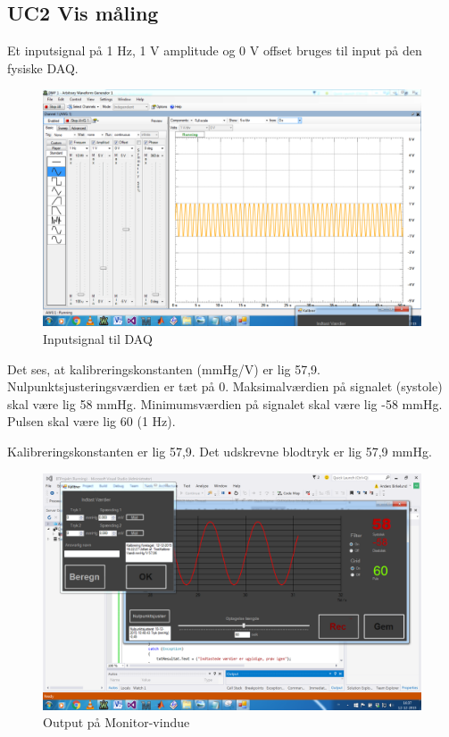 \subsection{UC2 Vis måling}
Et inputsignal på 1 Hz, 1 V amplitude og 0 V offset bruges til input på den fysiske DAQ. 
\begin{figure}[H]
	\centering
	\includegraphics[width=1\textwidth]{Figurer/Test_Vis_1}
	\caption{Inputsignal til DAQ}
\end{figure}

Det ses, at kalibreringskonstanten (mmHg/V) er lig 57,9.
Nulpunktsjusteringsværdien er tæt på 0.
Maksimalværdien på signalet (systole) skal være lig 58 mmHg.
Minimumsværdien på signalet skal være lig -58 mmHg. 
Pulsen skal være lig 60 (1 Hz).

Kalibreringskonstanten er lig 57,9. Det udskrevne blodtryk er lig 57,9 mmHg.
\begin{figure}[H]
	\centering
	\includegraphics[width=1\textwidth]{Figurer/Test_Vis_2}
	\caption{Output på Monitor-vindue}
\end{figure}




